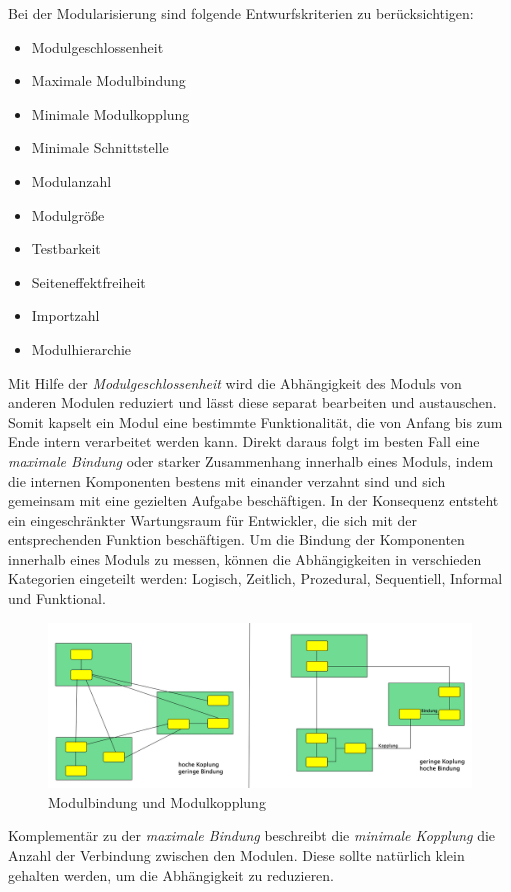     \bigbreak Bei der Modularisierung sind folgende Entwurfskriterien zu berücksichtigen: 
    \begin{itemize}
      \item Modulgeschlossenheit 
      \item Maximale Modulbindung 
      \item Minimale Modulkopplung 
      \item Minimale Schnittstelle 
      \item Modulanzahl 
      \item Modulgröße 
      \item Testbarkeit 
      \item Seiteneffektfreiheit 
      \item Importzahl 
      \item Modulhierarchie 
    \end{itemize}
    Mit Hilfe der \textit{Modulgeschlossenheit} wird die Abhängigkeit des Moduls von anderen Modulen reduziert und lässt diese separat bearbeiten und austauschen. Somit kapselt ein Modul eine bestimmte Funktionalität, die von Anfang bis zum Ende intern verarbeitet werden kann. 
    Direkt daraus folgt im besten Fall eine \textit{maximale Bindung} oder starker Zusammenhang innerhalb eines Moduls, indem die internen Komponenten bestens mit einander verzahnt sind und sich gemeinsam mit eine gezielten Aufgabe beschäftigen. In der Konsequenz entsteht ein eingeschränkter Wartungsraum für Entwickler, die sich mit der entsprechenden Funktion beschäftigen.   
    Um die Bindung der Komponenten innerhalb eines Moduls zu messen, können die Abhängigkeiten in verschieden Kategorien eingeteilt werden: Logisch, Zeitlich, Prozedural, Sequentiell, Informal und Funktional.
    \begin{figure}[h]
      \includegraphics[width=\textwidth]{material/images/kopplung.png}
      \caption{Modulbindung und Modulkopplung}
      \label{fig:kopplung}
    \end{figure}
    \newline Komplementär zu der \textit{maximale Bindung} beschreibt die \textit{minimale Kopplung} die Anzahl der Verbindung zwischen den Modulen. Diese sollte natürlich klein gehalten werden, um die Abhängigkeit zu reduzieren. 
